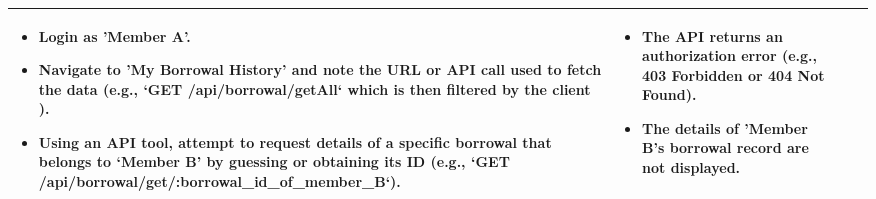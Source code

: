 \begin{longtable}{|>{\scriptsize\raggedright\arraybackslash}p{3cm}|>{\raggedright\arraybackslash}p{3cm}|>{\scriptsize\raggedright\arraybackslash}p{4cm}|>{\scriptsize\raggedright\arraybackslash}p{5cm}|}
    \begin{itemize}[leftmargin=*]
        \item Login as 'Member A'.
        \item Navigate to 'My Borrowal History' and note the URL or API call used to fetch the data (e.g., `GET /api/borrowal/getAll` which is then filtered by the client ).
        \item Using an API tool, attempt to request details of a specific borrowal that belongs to `Member B' by guessing or obtaining its ID (e.g., `GET /api/borrowal/get/:borrowal\_id\_of\_member\_B`).
    \end{itemize} & 
    \begin{itemize}[leftmargin=*]
        \item The API returns an authorization error (e.g., 403 Forbidden or 404 Not Found).
        \item The details of 'Member B's borrowal record are not displayed.
    \end{itemize} \\ \hline


\end{longtable}
